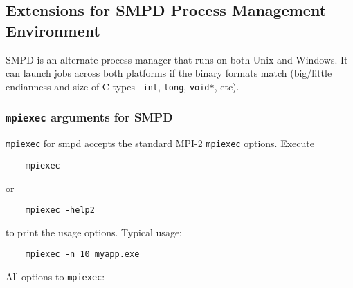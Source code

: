 \documentclass[dvipdfm,11pt]{article}
\begin{document}
\subsection{Extensions for SMPD Process Management Environment}
\label{sec:extensions-smpd}

SMPD is an alternate process manager that runs on both Unix and Windows.
It can launch jobs across both platforms if the binary formats match 
(big/little endianness and size of C types-- \texttt{int},
\texttt{long}, \texttt{void*}, etc).


\subsubsection{\texttt{mpiexec} arguments for SMPD}
\label{sec:mpiexec-smpd}

\texttt{mpiexec} for smpd accepts the standard MPI-2 \texttt{mpiexec}
options.  Execute
\begin{verbatim}
    mpiexec
\end{verbatim}
or
\begin{verbatim}
    mpiexec -help2
\end{verbatim}
to print the usage options.  Typical usage:
\begin{verbatim}
    mpiexec -n 10 myapp.exe
\end{verbatim}
All options to \texttt{mpiexec}:
\end{document}

